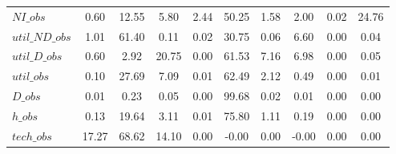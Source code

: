 \begin{center}
\begin{longtable}{lccccccccc}
$NI\_obs        $	 & 	         0.60	 & 	        12.55	 & 	         5.80	 & 	         2.44	 & 	        50.25	 & 	         1.58	 & 	         2.00	 & 	         0.02	 & 	        24.76 \\ 
$util\_ND\_obs  $	 & 	         1.01	 & 	        61.40	 & 	         0.11	 & 	         0.02	 & 	        30.75	 & 	         0.06	 & 	         6.60	 & 	         0.00	 & 	         0.04 \\ 
$util\_D\_obs   $	 & 	         0.60	 & 	         2.92	 & 	        20.75	 & 	         0.00	 & 	        61.53	 & 	         7.16	 & 	         6.98	 & 	         0.00	 & 	         0.05 \\ 
$util\_obs      $	 & 	         0.10	 & 	        27.69	 & 	         7.09	 & 	         0.01	 & 	        62.49	 & 	         2.12	 & 	         0.49	 & 	         0.00	 & 	         0.01 \\ 
$D\_obs         $	 & 	         0.01	 & 	         0.23	 & 	         0.05	 & 	         0.00	 & 	        99.68	 & 	         0.02	 & 	         0.01	 & 	         0.00	 & 	         0.00 \\ 
$h\_obs         $	 & 	         0.13	 & 	        19.64	 & 	         3.11	 & 	         0.01	 & 	        75.80	 & 	         1.11	 & 	         0.19	 & 	         0.00	 & 	         0.00 \\ 
$tech\_obs      $	 & 	        17.27	 & 	        68.62	 & 	        14.10	 & 	         0.00	 & 	        -0.00	 & 	         0.00	 & 	        -0.00	 & 	         0.00	 & 	         0.00 \\ 
\end{longtable}
 \end{center}
